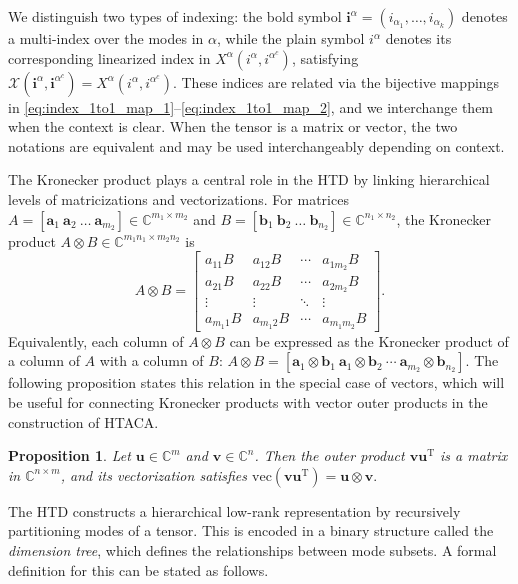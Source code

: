 \documentclass{article}
\theoremstyle{plain}
\newtheorem{proposition}[theorem]{Proposition}
\theoremstyle{definition}
\theoremstyle{remark}
\begin{document}
We distinguish two types of indexing: the bold symbol \(\bm{i}^{\alpha}=(i_{\alpha_1},\ldots,i_{\alpha_k})\) 
denotes a multi-index over the modes in \(\alpha\), while the plain symbol \(i^{\alpha}\) 
denotes its corresponding linearized index in \(X^{\alpha}(i^{\alpha},i^{\alpha^c})\), satisfying
$\mathcal{X}(\bm{i}^\alpha,\bm{i}^{\alpha^c})=X^{\alpha}(i^\alpha,i^{\alpha^c}).$
These indices are related via the bijective mappings in \eqref{eq:index_1to1_map_1}–\eqref{eq:index_1to1_map_2}, and we interchange them when the context is clear. When the tensor is a matrix or vector, the two notations are equivalent and may be used interchangeably depending on context.

The Kronecker product plays a central role in the HTD by linking hierarchical levels of matricizations and vectorizations. For matrices $A=[\bm{a}_1~\bm{a}_2~\ldots~\bm{a}_{m_2}]\in\mathbb{C}^{m_1\times m_2}$ and $B=[\bm{b}_1~\bm{b}_2~\ldots~\bm{b}_{n_2}]\in\mathbb{C}^{n_1\times n_2}$, the Kronecker product $A\otimes B\in\mathbb{C}^{m_1n_1\times m_2n_2}$ is
\begin{equation*}
    A\otimes B =
    \begin{bmatrix}
    a_{11}B & a_{12}B & \cdots & a_{1m_2}B\\
    a_{21}B & a_{22}B & \cdots & a_{2m_2}B\\
    \vdots  & \vdots  & \ddots & \vdots   \\
    a_{m_1 1}B & a_{m_1 2}B & \cdots & a_{m_1 m_2}B
    \end{bmatrix}.
\end{equation*}
Equivalently, each column of \(A \otimes B\) can be expressed as the Kronecker product of a column of \(A\) with a column of \(B\):
\(
A\otimes B =
\left[
\bm{a}_1\otimes\bm{b}_1~\bm{a}_1\otimes\bm{b}_2~\cdots~\bm{a}_{m_2}\otimes\bm{b}_{n_2}
\right].
\)
The following proposition states this relation in the special case of vectors, which will be useful for connecting Kronecker products with vector outer products in the construction of HTACA.

\begin{proposition}\label{prop:kronecker_outer_relation}
Let $\bm{u} \in \mathbb{C}^{m}$ and $\bm{v} \in \mathbb{C}^{n}$. Then the outer product $\bm{v}\bm{u}^{\mathrm{T}}$ is a matrix in $\mathbb{C}^{n \times m}$, and its vectorization satisfies
\(
\mathrm{vec}(\bm{v} \bm{u}^{\mathrm{T}}) = \bm{u} \otimes \bm{v}.
\)
\end{proposition}


The HTD constructs a hierarchical low-rank representation by recursively partitioning modes of a tensor. This is encoded in a binary structure called the \emph{dimension tree}, which defines the relationships between mode subsets. A formal definition for this can be stated as follows.
\end{document}
